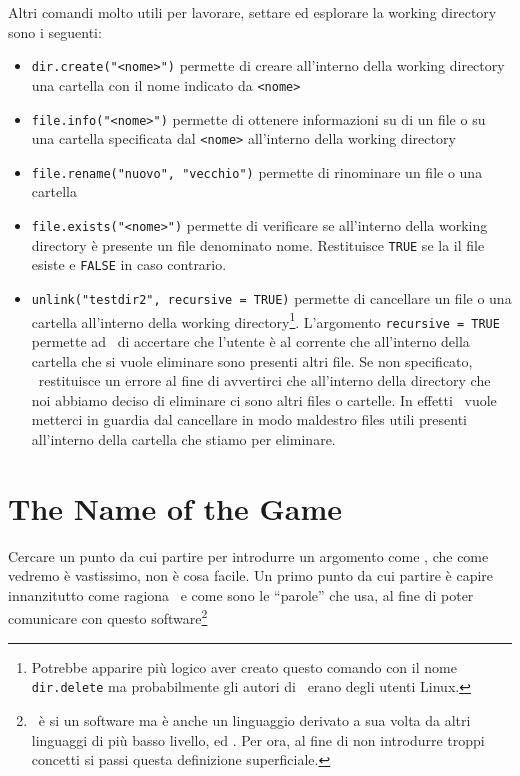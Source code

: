 Altri comandi molto utili per lavorare, settare ed esplorare la working directory sono i seguenti:
\begin{itemize}

\item \lstinline!dir.create("<nome>")! permette di creare all'interno della working directory una cartella con il nome indicato da \lstinline!<nome>!
\item \lstinline!file.info("<nome>")! permette di ottenere informazioni su di un file o su una cartella specificata dal \lstinline!<nome>! all'interno della working directory
\item \lstinline!file.rename("nuovo", "vecchio")!  permette di rinominare un file o una cartella
\item \lstinline!file.exists("<nome>")! permette di verificare se all'interno della working directory è presente un file denominato \textsf{nome}. Restituisce \lstinline!TRUE! se la il file esiste e \lstinline!FALSE! in caso contrario.
\item \lstinline!unlink("testdir2", recursive = TRUE)! permette di cancellare un file o una cartella all'interno della working directory\footnote{Potrebbe apparire più logico aver creato questo comando con il nome \lstinline!dir.delete! ma probabilmente gli autori di \erre\ erano degli utenti Linux.}. L'argomento \lstinline!recursive = TRUE! permette ad \erre\ di accertare che l'utente è al corrente che all'interno della cartella che si vuole eliminare sono presenti altri file. Se non specificato, \erre\ restituisce un errore al fine di avvertirci che all'interno della directory che noi abbiamo deciso di eliminare ci sono altri files o cartelle. In effetti \erre\ vuole metterci in guardia dal cancellare in modo maldestro files utili presenti all'interno della cartella che stiamo per eliminare.
\end{itemize}

\section{The Name of the Game}

Cercare un punto da cui partire per introdurre un argomento come \erre, che come vedremo è vastissimo, non è cosa facile.
Un primo punto da cui partire è capire innanzitutto come ragiona \erre\ e come sono le ``parole'' che usa, al fine di poter comunicare con questo software\footnote{\erre\ è si un software ma è anche un linguaggio derivato a sua volta da altri linguaggi di più basso livello,  ed . Per ora, al fine di non introdurre troppi concetti si passi questa definizione superficiale.}

